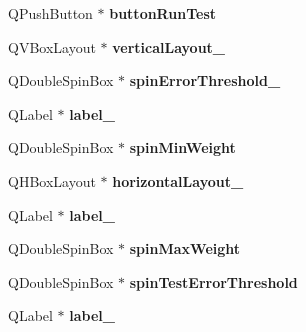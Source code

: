 \begin{DoxyCompactItemize}
\item 
\mbox{\label{class_ui___main_form_a44d4a557157cafc95c2f5c4781d8d6f5}} 
Q\+Push\+Button $\ast$ {\bfseries button\+Run\+Test}
\item 
\mbox{\label{class_ui___main_form_a9bd3ba7ebcf56fa6644c01357f7e7774}} 
Q\+V\+Box\+Layout $\ast$ {\bfseries vertical\+Layout\+\_}
\item 
\mbox{\label{class_ui___main_form_a268b5058831ba9bf5b4d9be7fc17e371}} 
Q\+Double\+Spin\+Box $\ast$ {\bfseries spin\+Error\+Threshold\+\_}
\item 
\mbox{\label{class_ui___main_form_a36cd193b72bdceeb8d17f0fa947765e7}} 
Q\+Label $\ast$ {\bfseries label\+\_}
\item 
\mbox{\label{class_ui___main_form_aa46155980f918925c912f51712584944}} 
Q\+Double\+Spin\+Box $\ast$ {\bfseries spin\+Min\+Weight}
\item 
\mbox{\label{class_ui___main_form_ae7e5f38b540caee2e40eb9582c5ecd58}} 
Q\+H\+Box\+Layout $\ast$ {\bfseries horizontal\+Layout\+\_}
\item 
\mbox{\label{class_ui___main_form_a4de47404f1fad71a43a25cb09227e069}} 
Q\+Label $\ast$ {\bfseries label\+\_}
\item 
\mbox{\label{class_ui___main_form_a744a22aee0967602e6c30d25a3e83914}} 
Q\+Double\+Spin\+Box $\ast$ {\bfseries spin\+Max\+Weight}
\item 
\mbox{\label{class_ui___main_form_a3cb13623a5b5f2526f1ab2a9548ec093}} 
Q\+Double\+Spin\+Box $\ast$ {\bfseries spin\+Test\+Error\+Threshold}
\item 
\mbox{\label{class_ui___main_form_a68f26d8b81d1a51e6b61bcc4b756b74d}} 
Q\+Label $\ast$ {\bfseries label\+\_}
\item 
\mbox{\label{class_ui___main_form_ade966547758aa4ca20ff9fcb9fe265a1}} 

\end{DoxyCompactItemize}
